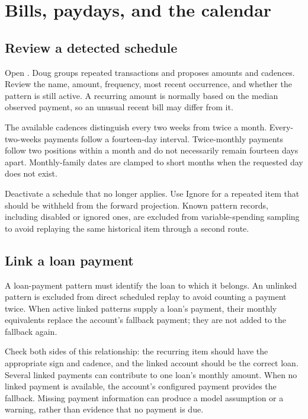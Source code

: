 \chapter{Bills, paydays, and the calendar}\label{ch:calendar}
\section{Review a detected schedule}
Open . Doug groups repeated transactions and proposes amounts and cadences. Review the name, amount, frequency, most recent occurrence, and whether the pattern is still active. A recurring amount is normally based on the median observed payment, so an unusual recent bill may differ from it.

The available cadences distinguish every two weeks from twice a month. Every-two-weeks payments follow a fourteen-day interval. Twice-monthly payments follow two positions within a month and do not necessarily remain fourteen days apart. Monthly-family dates are clamped to short months when the requested day does not exist.

Deactivate a schedule that no longer applies. Use Ignore for a repeated item that should be withheld from the forward projection. Known pattern records, including disabled or ignored ones, are excluded from variable-spending sampling to avoid replaying the same historical item through a second route.

\section{Link a loan payment}
A loan-payment pattern must identify the loan to which it belongs. An unlinked pattern is excluded from direct scheduled replay to avoid counting a payment twice. When active linked patterns supply a loan's payment, their monthly equivalents replace the account's fallback payment; they are not added to the fallback again.

Check both sides of this relationship: the recurring item should have the appropriate sign and cadence, and the linked account should be the correct loan. Several linked payments can contribute to one loan's monthly amount. When no linked payment is available, the account's configured payment provides the fallback. Missing payment information can produce a model assumption or a warning, rather than evidence that no payment is due.

